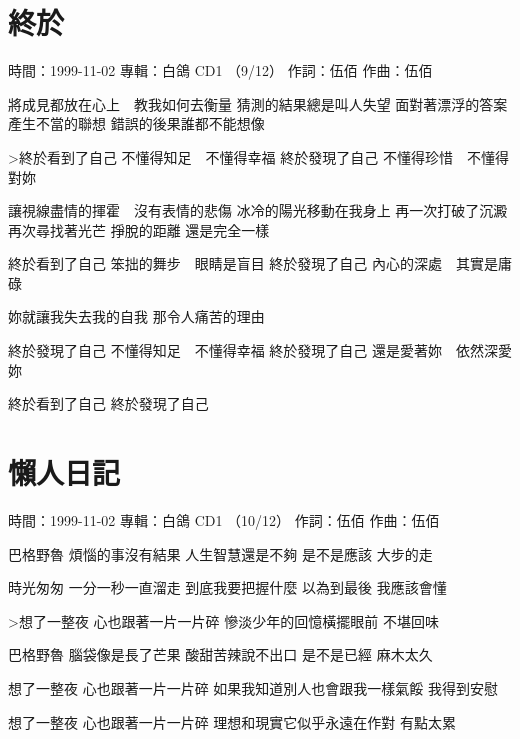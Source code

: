 \documentclass[UTF8,a4paper,oneside,twocolumn,12pt]{ctexbook}
\newcommand{\infopair}[2]{\textbullet #1：#2}
\newcommand{\zc}[1][伍佰]{\infopair{作詞}{#1}}
\newcommand{\zq}[1][伍佰]{\infopair{作曲}{#1}}
\newcommand{\zj}[1]{\infopair{專輯}{#1}}
\newcommand{\sj}[1]{\infopair{時間}{#1}}
\newenvironment{info}{\begin{flushleft}\kaishu
	}
	{\end{flushleft}\normalsize\yahei\par}
\newenvironment{lyric}{
	}
{}
\begin{document}
\section{終於}
\begin{info}
	\sj{1999-11-02}
	\zj{白鴿 CD1 （9/12）}
	\zc
	\zq
\end{info}
\begin{lyric}
	將成見都放在心上　教我如何去衡量
	猜測的結果總是叫人失望
	面對著漂浮的答案　產生不當的聯想
	錯誤的後果誰都不能想像

	>終於看到了自己
	不懂得知足　不懂得幸福
	終於發現了自己
	不懂得珍惜　不懂得對妳

	讓視線盡情的揮霍　沒有表情的悲傷
	冰冷的陽光移動在我身上
	再一次打破了沉澱　再次尋找著光芒
	掙脫的距離  還是完全一樣

	終於看到了自己
	笨拙的舞步　眼睛是盲目
	終於發現了自己
	內心的深處　其實是庸碌

	妳就讓我失去我的自我
	那令人痛苦的理由

	終於發現了自己
	不懂得知足　不懂得幸福
	終於發現了自己
	還是愛著妳　依然深愛妳

	終於看到了自己
	終於發現了自己
\end{lyric}

\section{懶人日記}
\begin{info}
	\sj{1999-11-02}
	\zj{白鴿 CD1 （10/12）}
	\zc
	\zq
\end{info}
\begin{lyric}
	巴格野魯 煩惱的事沒有結果 人生智慧還是不夠
	是不是應該 大步的走

	時光匆匆 一分一秒一直溜走 到底我要把握什麼
	以為到最後 我應該會懂

	>想了一整夜 心也跟著一片一片碎
	慘淡少年的回憶橫擺眼前 不堪回味

	巴格野魯 腦袋像是長了芒果 酸甜苦辣說不出口
	是不是已經 麻木太久

	想了一整夜 心也跟著一片一片碎
	如果我知道別人也會跟我一樣氣餒
	我得到安慰

	想了一整夜 心也跟著一片一片碎
	理想和現實它似乎永遠在作對 有點太累
\end{lyric}
\end{document}
